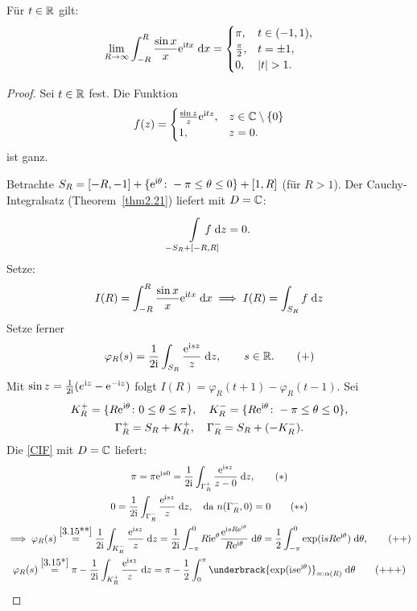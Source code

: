 \documentclass[a4paper,twoside,DIV15,BCOR12mm]{scrbook}
\begin{document}
\begin{bsp*} Für $t\in\mathbb{R}$ gilt:
\[\lim_{R\to\infty}\int_{-R}^{R}{\frac{\sin x}{x}\mathrm{e}^{\mathrm{i} tx}}\;\mathrm{d} x = \begin{cases}\pi,&t\in(-1,1),\\\frac{\pi}{2},&t=\pm 1,\\0,&\left\lvert t\right\lvert>1.\end{cases}\]
\begin{proof}
Sei $t\in\mathbb{R}$ fest. Die Funktion
\[f(z) = \begin{cases}\frac{\sin z}{z}\mathrm{e}^{\mathrm{i} tz},&z\in\mathbb{C}\setminus\{0\}\\1,&z=0.\end{cases}\] ist ganz.

Betrachte $S_R = [-R,-1]+\{\mathrm{e}^{\mathrm{i}\theta}\colon -\pi\leq\theta\leq 0\} + [1,R]$ (für $R>1$). Der Cauchy-Integralsatz (Theorem~\ref{thm2.21}) liefert mit $D=\mathbb{C}$:
\[\Integral{-S_R+[-R,R]}{}{\!\!\!\!\!\!\!\!\!\!f}{z} = 0.\]
Setze:
\[I(R) = \int_{-R}^{R}{\frac{\sin x}{x}\mathrm{e}^{\mathrm{i} tx}}\;\mathrm{d} x\implies I(R) = \int_{S_R}^{}{f}\;\mathrm{d} z\]
Setze ferner
\[\label{3.15+}\varphi_R(s) = \frac{1}{2\mathrm{i}}\int_{S_R}^{}{\frac{\mathrm{e}^{\mathrm{i} sz}}{z}}\;\mathrm{d} z,\qquad s\in\mathbb{R}.\tag{+}\]
Mit $\sin z = \frac{1}{2\mathrm{i}}(e^{\mathrm{i} z}-\mathrm{e}^{-\mathrm{i} z})$ folgt $I(R) = \varphi_R(t+1) - \varphi_R(t-1)$. Sei
\begin{gather*}
K_R^+ = \{R\mathrm{e}^{\mathrm{i}\theta}\colon 0 \leq\theta\leq\pi\},\quad K_R^- = \{R\mathrm{e}^{\mathrm{i}\theta}\colon -\pi\leq\theta\leq 0\},\\
\Gamma_R^+ = S_R + K_R^+,\quad \Gamma_R^- = S_R + (-K_R^-).
\end{gather*}
Die \eqref{CIF} mit $D=\mathbb{C}$ liefert:
\begin{gather*}
\pi = \pi\e^{\i s0} = \frac{1}{2\i}\integral{\Gamma_R^+}{}{\frac{\e^{\i sz}}{z-0}}{z},\label{3.15*}\tag{$*$}\\
0=\frac{1}{2\i}\integral{\Gamma_R^-}{}{\frac{\e^{\i sz}}{z}}{z},\quad\text{da }n(\Gamma_R^-,0) = 0\label{3.15**}\tag{$**$}\\
\folgt\varphi_R(s) \overset{\eqref{3.15**}}{=} \frac{1}{2\i}\integral{K_R^-}{}{\frac{\e^{\i sz}}{z}}{z} = \frac{1}{2\i}\integral{-\pi}{0}{R\i\e^{\theta}\frac{\e^{\i sR\e^{\i\theta}}}{R\e^{\i\theta}}}{\theta} = \frac{1}{2}\integral{-\pi}{0}{\exp(\i sR\e^{\i\theta})}{\theta},\label{3.15++}\tag{++}\\
\varphi_R(s) \overset{\eqref{3.15*}}{=}\pi - \frac{1}{2\i}\integral{K_R^+}{}{\frac{\e^{\i sz}}{z}}{z} = \pi-\frac{1}{2}\integral{0}{\pi}{\underbrack{\exp(\i s\e^{\i\theta})}_{\ad\alpha(R)}}{\theta}\label{3.15+++}\tag{+++}
\end{gather*}


\end{proof}
\end{bsp*}
\end{document}
